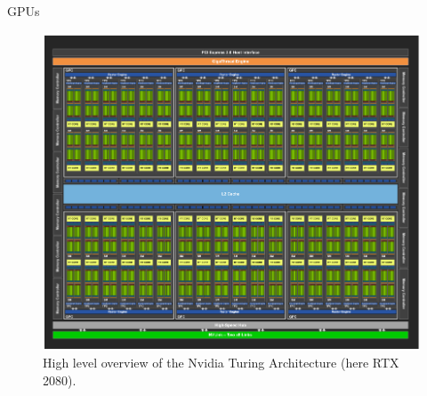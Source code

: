 \documentclass[10pt]{beamer}
\begin{document}
\begin{frame}[allowframebreaks]{GPUs}
 \begin{figure}
       \begin{center}
       \includegraphics[keepaspectratio, width=\textwidth,height=0.8\textheight-4\baselineskip]{img/209_turing.png}
      \end{center}
      \caption{High level overview of the Nvidia Turing Architecture (here RTX 2080).~\autocite{nvidia}}
      \end{figure}
      \framebreak
      \begin{figure}
       \begin{center}

\end{center}
\end{figure}
\end{frame}
\end{document}
